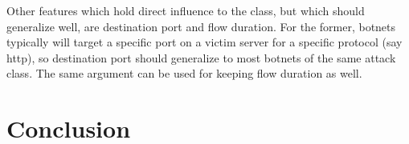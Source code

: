 \documentclass[letterpaper]{article}
\begin{document}
Other features which hold direct influence to the class, but which should generalize well, are destination port and flow duration. For the former, botnets typically will target a specific port on a victim server for a specific protocol (say http), so destination port should generalize to most botnets of the same attack class.  The same argument can be used for keeping flow duration as well.

\section{Conclusion}



\end{document}
